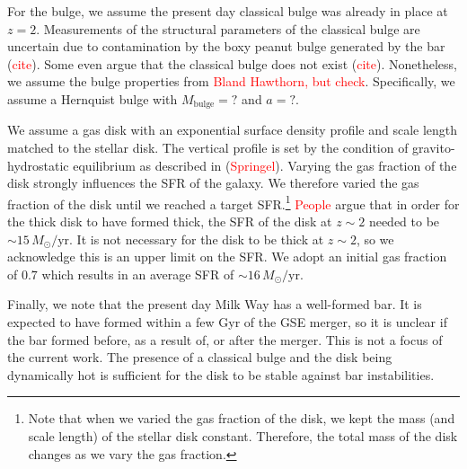\documentclass[linenumbers, twocolumn]{aastex631}
\newcommand{\Msun}{\ensuremath{M_{\odot}}}
\newcommand{\yr}{\ensuremath{\textrm{yr}}}
\begin{document}
For the bulge, we assume the present day classical bulge was already in place at
$z=2$. Measurements of the structural parameters of the classical bulge are
uncertain due to contamination by the boxy peanut bulge generated by the bar
(\textcolor{red}{cite}). Some even argue that the classical bulge does not exist
(\textcolor{red}{cite}). Nonetheless, we assume the bulge properties from
\textcolor{red}{Bland Hawthorn, but check}. Specifically, we assume a Hernquist
bulge with $M_{\textrm{bulge}}=?$ and $a=?$.

We assume a gas disk with an exponential surface density profile and scale
length matched to the stellar disk. The vertical profile is set by the condition
of gravito-hydrostatic equilibrium as described in (\textcolor{red}{Springel}).
Varying the gas fraction of the disk strongly influences the SFR of the galaxy.
We therefore varied the gas fraction of the disk until we reached a target
SFR.\footnote{Note that when we varied the gas fraction of the disk, we kept the
mass (and scale length) of the stellar disk constant. Therefore, the total mass
of the disk changes as we vary the gas fraction.} \textcolor{red}{People} argue
that in order for the thick disk to have formed thick, the SFR of the disk at
$z\sim2$ needed to be $\sim15\,\Msun/\yr$. It is not necessary for the disk to
be thick at $z\sim2$, so we acknowledge this is an upper limit on the SFR. We
adopt an initial gas fraction of $0.7$ which results in an average SFR of
$\sim16\,\Msun/\yr$.

Finally, we note that the present day Milk Way has a well-formed bar. It is
expected to have formed within a few Gyr of the GSE merger, so it is unclear if
the bar formed before, as a result of, or after the merger. This is not a focus
of the current work. The presence of a classical bulge and the disk being
dynamically hot is sufficient for the disk to be stable against bar
instabilities.
\end{document}
